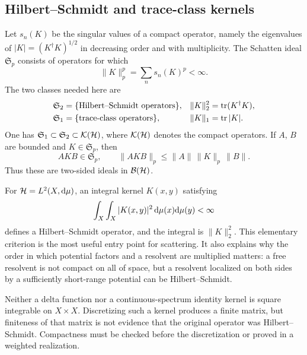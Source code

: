 \subsection{Hilbert--Schmidt and trace-class kernels}
\label{subsec:schatten-ideals}

Let $s_n(K)$ be the singular values of a compact operator, namely the
eigenvalues of $|K|=(K^\dagger K)^{1/2}$ in decreasing order and with
multiplicity.  The Schatten ideal $\mathfrak S_p$ consists of operators for
which
\begin{equation}
  \|K\|_p^p=\sum_n s_n(K)^p<\infty .
  \label{eq:schatten-norm}
\end{equation}
The two classes needed here are
\begin{align}
  \mathfrak S_2&=\{\text{Hilbert--Schmidt operators}\},
  &\|K\|_2^2&=\operatorname{tr}(K^\dagger K),
  \label{eq:hilbert-schmidt-definition}\\
  \mathfrak S_1&=\{\text{trace-class operators}\},
  &\|K\|_1&=\operatorname{tr}|K|.
  \label{eq:trace-class-schatten-definition}
\end{align}
One has $\mathfrak S_1\subset\mathfrak S_2\subset\mathcal K(\mathcal{H})$, where
$\mathcal K(\mathcal{H})$ denotes the compact operators.  If $A$, $B$ are bounded and
$K\in\mathfrak S_p$, then
\begin{equation}
  AKB\in\mathfrak S_p,
  \qquad
  \|AKB\|_p\leq\|A\|\,\|K\|_p\,\|B\|.
  \label{eq:schatten-ideal-property}
\end{equation}
Thus these are two-sided ideals in $\mathcal{B}(\mathcal{H})$.

For $\mathcal{H}=L^2(X,\mathrm{d}\mu)$, an integral kernel $K(x,y)$ satisfying
\begin{equation}
  \int_X\int_X |K(x,y)|^2\,\mathrm{d}\mu(x)\mathrm{d}\mu(y)<\infty
  \label{eq:hs-kernel-criterion}
\end{equation}
defines a Hilbert--Schmidt operator, and the integral is $\|K\|_2^2$.
This elementary criterion is the most useful entry point for scattering.
It also explains why the order in which potential factors and a resolvent are
multiplied matters: a free resolvent is not compact on all of space, but a
resolvent localized on both sides by a sufficiently short-range potential can
be Hilbert--Schmidt.

\begin{warningbox}
Neither a delta function nor a continuous-spectrum identity kernel is square
integrable on $X\times X$.  Discretizing such a kernel produces a finite
matrix, but finiteness of that matrix is not evidence that the original
operator was Hilbert--Schmidt.  Compactness must be checked before the
discretization or proved in a weighted realization.
\end{warningbox}

